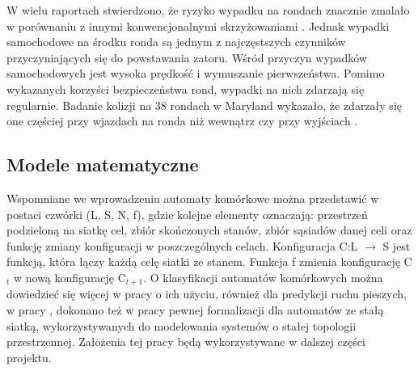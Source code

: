 \documentclass[a4paper,12pt]{article}
\begin{document}
W wielu raportach stwierdzono, że ryzyko wypadku na rondach znacznie zmalało
w porównaniu z innymi konwencjonalnymi skrzyżowaniami \cite{persaud2001safety}. Jednak wypadki samochodowe na środku ronda są jednym z najczęstszych czynników przyczyniających się do powstawania zatoru. Wśród przyczyn wypadków samochodowych jest wysoka prędkość i wymuszanie pierwszeństwa. Pomimo wykazanych korzyści bezpieczeństwa rond, wypadki na nich zdarzają się regularnie. Badanie kolizji na 38 rondach w Maryland wykazało, że zdarzały się one częściej
przy wjazdach na ronda niż wewnątrz czy przy wyjściach \cite{mandavilli2009crash}.




\subsection*{Modele matematyczne}
			Wspomniane we wprowadzeniu automaty komórkowe można przedstawić w postaci czwórki (L, S, N, f), gdzie kolejne elementy oznaczają: przestrzeń podzieloną na siatkę cel, zbiór skończonych stanów, zbiór sąsiadów danej celi oraz funkcję zmiany konfiguracji w poszczególnych celach. Konfiguracja C:L $\rightarrow$ S jest funkcją, która łączy każdą celę siatki ze stanem. Funkcja f zmienia konfigurację C$_{t}$ w nową konfigurację C$_{t+1}$. O klasyfikacji automatów komórkowych można dowiedzieć się więcej w pracy \cite{wkasalgorytmy} o ich użyciu, również dla predykcji ruchu pieszych, w pracy \cite{wkas2004zastosowanie}, dokonano też w pracy \cite{dudek2005formalizacja} pewnej formalizacji dla automatów ze stałą siatką, wykorzystywanych do modelowania systemów o stałej topologii przestrzennej. Założenia tej pracy będą wykorzystywane w dalszej części projektu.
			
\end{document}
